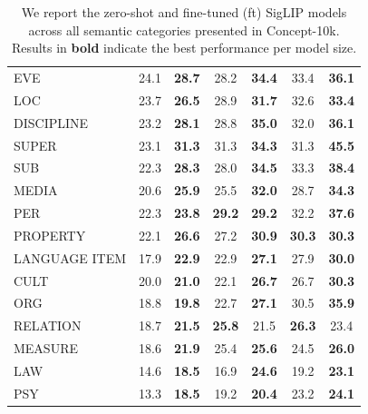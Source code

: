 \documentclass[11pt]{article}
\newcommand{\benchmark}{Concept-10k}
\begin{document}
\begin{table}[t!]
\begin{tabularx}{\textwidth}{l|cc|cc|cc}
EVE      & 24.1 & \textbf{28.7} & 28.2 & \textbf{34.4} & 33.4 & \textbf{36.1}
\\ 
LOC      & 23.7 & \textbf{26.5} & 28.9 & \textbf{31.7} & 32.6 & \textbf{33.4}
\\
DISCIPLINE & 23.2 & \textbf{28.1} & 28.8 & \textbf{35.0} & 32.0 & \textbf{36.1}
\\
SUPER    & 23.1 & \textbf{31.3} & 31.3 & \textbf{34.3} & 31.3 & \textbf{45.5}
\\ 
SUB      & 22.3 & \textbf{28.3} & 28.0 & \textbf{34.5} & 33.3 & \textbf{38.4}
\\
MEDIA    & 20.6 & \textbf{25.9} & 25.5 & \textbf{32.0} & 28.7 & \textbf{34.3}
\\
PER      & 22.3 & \textbf{23.8} & \textbf{29.2} & \textbf{29.2} & 32.2 & \textbf{37.6}
\\
PROPERTY & 22.1 & \textbf{26.6} & 27.2 & \textbf{30.9} & \textbf{30.3} & \textbf{30.3}
\\
LANGUAGE ITEM & 17.9 & \textbf{22.9} & 22.9 & \textbf{27.1} & 27.9 & \textbf{30.0}
\\
CULT     & 20.0 & \textbf{21.0} & 22.1 & \textbf{26.7} & 26.7 & \textbf{30.3}
\\
ORG      & 18.8 & \textbf{19.8} & 22.7 & \textbf{27.1} & 30.5 & \textbf{35.9}
\\
RELATION & 18.7 & \textbf{21.5} & \textbf{25.8} & 21.5 & \textbf{26.3} & 23.4
\\
MEASURE  & 18.6 & \textbf{21.9} & 25.4 & \textbf{25.6} & 24.5 & \textbf{26.0}
\\
LAW      & 14.6 & \textbf{18.5} & 16.9 & \textbf{24.6} & 19.2 & \textbf{23.1}
\\
PSY      & 13.3 & \textbf{18.5} & 19.2 & \textbf{20.4} & 23.2 & \textbf{24.1} \\
\bottomrule
\end{tabularx}
\caption{We report the zero-shot and fine-tuned (ft) SigLIP models across all semantic categories presented in \benchmark. Results in \textbf{bold} indicate the best performance per model size.}
\label{tab:siglip-semantic-types}
\end{table}
\end{document}

